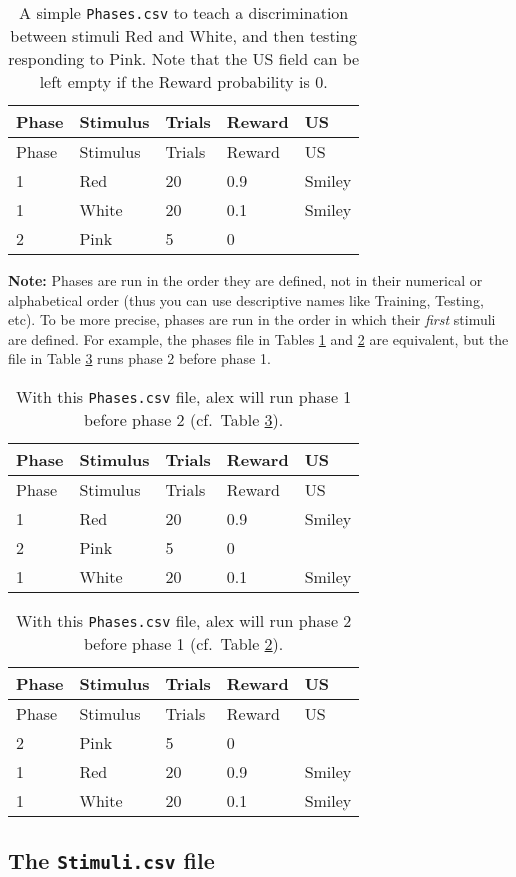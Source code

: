 \documentclass[11pt,]{article}
\begin{document}
\begin{longtable}[c]{@{}lllll@{}}
\caption{A simple \texttt{Phases.csv} to teach a discrimination between
stimuli Red and White, and then testing responding to Pink. Note that
the US field can be left empty if the Reward probability is 0.
\label{phases}}\tabularnewline
\toprule
Phase & Stimulus & Trials & Reward & US\tabularnewline
\midrule
\endfirsthead
\toprule
Phase & Stimulus & Trials & Reward & US\tabularnewline
\midrule
\endhead
1 & Red & 20 & 0.9 & Smiley\tabularnewline
1 & White & 20 & 0.1 & Smiley\tabularnewline
2 & Pink & 5 & 0 &\tabularnewline
\bottomrule
\end{longtable}

\textbf{Note:} Phases are run in the order they are defined, not in
their numerical or alphabetical order (thus you can use descriptive
names like Training, Testing, etc). To be more precise, phases are run
in the order in which their \emph{first} stimuli are defined. For
example, the phases file in Tables \ref{phases} and \ref{phases-order1}
are equivalent, but the file in Table \ref{phases-order2} runs phase 2
before phase 1.

\begin{longtable}[c]{@{}lllll@{}}
\caption{With this \texttt{Phases.csv} file, alex will run phase 1
before phase 2 (cf.~Table \ref{phases-order2}).
\label{phases-order1}}\tabularnewline
\toprule
Phase & Stimulus & Trials & Reward & US\tabularnewline
\midrule
\endfirsthead
\toprule
Phase & Stimulus & Trials & Reward & US\tabularnewline
\midrule
\endhead
1 & Red & 20 & 0.9 & Smiley\tabularnewline
2 & Pink & 5 & 0 &\tabularnewline
1 & White & 20 & 0.1 & Smiley\tabularnewline
\bottomrule
\end{longtable}

\begin{longtable}[c]{@{}lllll@{}}
\caption{With this \texttt{Phases.csv} file, alex will run phase 2
before phase 1 (cf.~Table \ref{phases-order1}).
\label{phases-order2}}\tabularnewline
\toprule
Phase & Stimulus & Trials & Reward & US\tabularnewline
\midrule
\endfirsthead
\toprule
Phase & Stimulus & Trials & Reward & US\tabularnewline
\midrule
\endhead
2 & Pink & 5 & 0 &\tabularnewline
1 & Red & 20 & 0.9 & Smiley\tabularnewline
1 & White & 20 & 0.1 & Smiley\tabularnewline
\bottomrule
\end{longtable}

\subsection{The \texttt{Stimuli.csv} file}\label{the-stimuli.csv-file}
\end{document}
